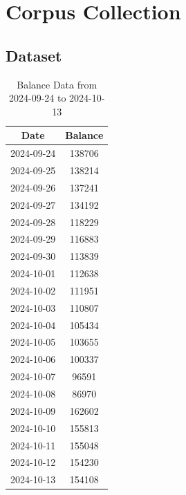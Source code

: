 \documentclass[12pt]{book} %
\begin{document}
\section{Corpus Collection}

\subsection{Dataset}

\begin{table}[h!]
    \centering
    \begin{tabular}{|c|c|}
        \hline
        \textbf{Date} & \textbf{Balance} \\ \hline
        2024-09-24 & 138706 \\ \hline
        2024-09-25 & 138214 \\ \hline
        2024-09-26 & 137241 \\ \hline
        2024-09-27 & 134192 \\ \hline
        2024-09-28 & 118229 \\ \hline
        2024-09-29 & 116883 \\ \hline
        2024-09-30 & 113839 \\ \hline
        2024-10-01 & 112638 \\ \hline
        2024-10-02 & 111951 \\ \hline
        2024-10-03 & 110807 \\ \hline
        2024-10-04 & 105434 \\ \hline
        2024-10-05 & 103655 \\ \hline
        2024-10-06 & 100337 \\ \hline
        2024-10-07 & 96591 \\ \hline
        2024-10-08 & 86970 \\ \hline
        2024-10-09 & 162602 \\ \hline
        2024-10-10 & 155813 \\ \hline
        2024-10-11 & 155048 \\ \hline
        2024-10-12 & 154230 \\ \hline
        2024-10-13 & 154108 \\ \hline
    \end{tabular}
    \caption{Balance Data from 2024-09-24 to 2024-10-13}
    \label{tab:balance_data}
\end{table}
\end{document}
